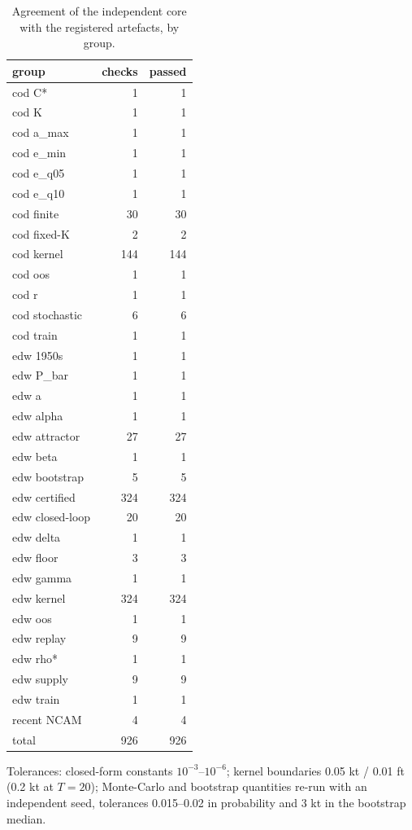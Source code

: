 \begin{table}[H]
\centering
\caption{Agreement of the independent core with the registered artefacts, by group.}
\label{tab:si-checks}
\small
\begin{tabular}{lrr}
\toprule
group & checks & passed \\
\midrule
cod C* & 1 & 1 \\
cod K & 1 & 1 \\
cod a\_max & 1 & 1 \\
cod e\_min & 1 & 1 \\
cod e\_q05 & 1 & 1 \\
cod e\_q10 & 1 & 1 \\
cod finite & 30 & 30 \\
cod fixed-K & 2 & 2 \\
cod kernel & 144 & 144 \\
cod oos & 1 & 1 \\
cod r & 1 & 1 \\
cod stochastic & 6 & 6 \\
cod train & 1 & 1 \\
edw 1950s & 1 & 1 \\
edw P\_bar & 1 & 1 \\
edw a & 1 & 1 \\
edw alpha & 1 & 1 \\
edw attractor & 27 & 27 \\
edw beta & 1 & 1 \\
edw bootstrap & 5 & 5 \\
edw certified & 324 & 324 \\
edw closed-loop & 20 & 20 \\
edw delta & 1 & 1 \\
edw floor & 3 & 3 \\
edw gamma & 1 & 1 \\
edw kernel & 324 & 324 \\
edw oos & 1 & 1 \\
edw replay & 9 & 9 \\
edw rho* & 1 & 1 \\
edw supply & 9 & 9 \\
edw train & 1 & 1 \\
recent NCAM & 4 & 4 \\
\midrule
total & 926 & 926 \\
\bottomrule
\end{tabular}
\par\smallskip\begin{minipage}{0.97\linewidth}\footnotesize Tolerances: closed-form constants $10^{-3}$--$10^{-6}$; kernel boundaries 0.05 kt / 0.01 ft (0.2 kt at $T=20$); Monte-Carlo and bootstrap quantities re-run with an independent seed, tolerances 0.015--0.02 in probability and 3 kt in the bootstrap median.\end{minipage}
\end{table}
